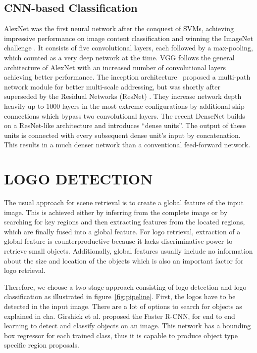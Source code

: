 \documentclass[a4paper,twoside]{article}
\begin{document}
\subsection{\acs{CNN}-based Classification}
AlexNet \cite{krizhevsky2012b} was the first neural network after the conquest of \acp{SVM}, achieving impressive performance on image content classification and winning the ImageNet challenge \cite{deng2009}. It consists of five convolutional layers, each followed by a max-pooling, which counted as a very deep network at the time. 
VGG \cite{simonyan2014} follows the general architecture of AlexNet with an increased number of convolutional layers achieving better performance. 
The inception architecture~\cite{szegedy2015} proposed a multi-path network module for better multi-scale addressing, but was shortly after superseded by the Residual Networks (ResNet) \cite{he2015,he2016}. They increase network depth heavily up to 1000 layers in the most extreme configurations by additional skip connections which bypass two convolutional layers. 
The recent DenseNet \cite{huang2016} builds on a ResNet-like architecture and introduces ``dense units''. The output of these units is connected with every subsequent dense unit's input by concatenation. This results in a much denser network than a conventional feed-forward network.


\section{\uppercase{Logo Detection}}
\noindent The usual approach for scene retrieval is to create a global feature of the input image. This is achieved either by inferring from the complete image or by searching for key regions and then extracting features from the located regions, which are finally fused into a global feature. For logo retrieval, extraction of a global feature is counterproductive because it lacks discriminative power to retrieve small objects. Additionally, global features usually include no information about the size and location of the objects which is also an important factor for logo retrieval.

Therefore, we choose a two-stage approach consisting of logo detection and logo classification as illustrated in figure~\ref{fig:pipeline}. First, the logos have to be detected in the input image. 
There are a lot of options to search for objects as explained in cha. Girshick et al. \cite{ren2015} proposed the Faster R-CNN, for end to end learning to detect and classify objects on an image. This network has a bounding box regressor for each trained class, thus it is capable to produce object type specific region proposals.
\end{document}
